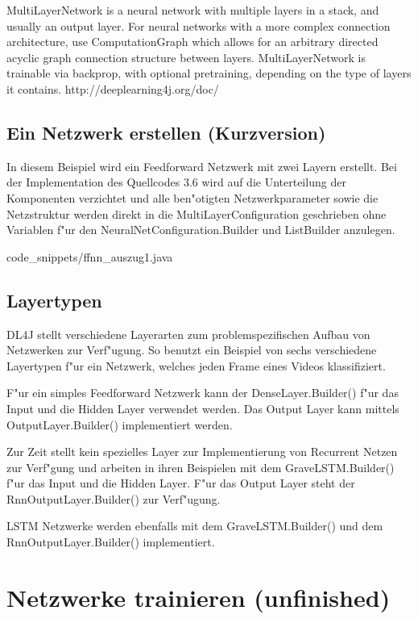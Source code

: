{MultiLayerNetwork is a neural network with multiple layers in a stack, and usually an output layer. For neural networks with a more complex connection architecture, use ComputationGraph which allows for an arbitrary directed acyclic graph connection structure between layers. MultiLayerNetwork is trainable via backprop, with optional pretraining, depending on the type of layers it contains.
http://deeplearning4j.org/doc/

\subsection{Ein Netzwerk erstellen (Kurzversion)}
In diesem Beispiel wird ein Feedforward Netzwerk mit zwei Layern erstellt. Bei der Implementation des Quellcodes 3.6 wird auf die Unterteilung der Komponenten verzichtet und alle ben"otigten Netzwerkparameter sowie die Netzstruktur werden direkt in die MultiLayerConfiguration geschrieben ohne Variablen f"ur den NeuralNetConfiguration.Builder und ListBuilder anzulegen.

{code_snippets/ffnn_auszug1.java}

\subsection{Layertypen}
DL4J stellt verschiedene Layerarten zum problemspezifischen Aufbau von Netzwerken zur Verf"ugung. So benutzt ein Beispiel von \cite{DL4J} sechs verschiedene Layertypen f"ur ein Netzwerk, welches jeden Frame eines Videos klassifiziert. 

F"ur ein simples Feedforward Netzwerk kann der DenseLayer.Builder() f"ur das Input und die Hidden Layer verwendet werden. Das Output Layer kann mittels OutputLayer.Builder() implementiert werden.

Zur Zeit stellt \cite{DL4J} kein spezielles Layer zur Implementierung von Recurrent Netzen zur Verf"gung und arbeiten in ihren Beispielen mit dem GraveLSTM.Builder() f"ur das Input und die Hidden Layer. F"ur das Output Layer steht der RnnOutputLayer.Builder() zur Verf"ugung.

LSTM Netzwerke werden ebenfalls mit dem GraveLSTM.Builder() und dem RnnOutputLayer.Builder() implementiert.


\section{Netzwerke trainieren (unfinished)}
}
